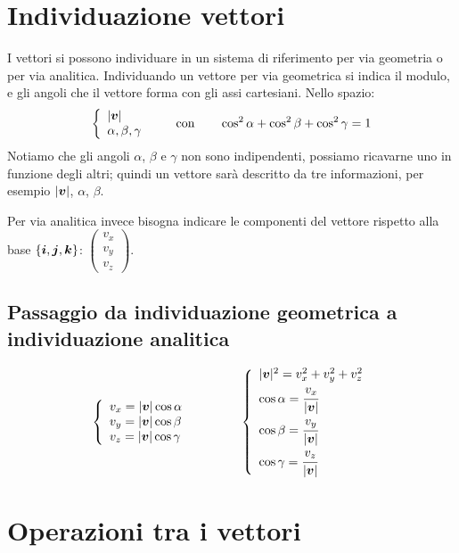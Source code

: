 \section{Individuazione vettori}
I vettori si possono individuare in un sistema di riferimento per via geometria o per via analitica. Individuando un vettore per via geometrica si indica il modulo, e gli angoli che il vettore forma con gli assi cartesiani. Nello spazio:
\begin{equation*}
\left\{
\begin{array}{l}
|\boldsymbol{v}|\\
\alpha,\beta,\gamma
\end{array}\right. \qquad \text{con}\qquad \cos^2 \alpha+\cos^2 \beta + \cos^2
\gamma=1
\end{equation*}
Notiamo che gli angoli $\alpha$, $\beta$ e $\gamma$ non sono indipendenti, possiamo ricavarne uno in funzione degli altri; quindi un vettore sarà descritto da tre informazioni, per esempio $|\boldsymbol{v}|$, $\alpha$, $\beta$.

Per via analitica invece bisogna indicare le componenti del vettore rispetto alla base $\{\boldsymbol{i}, \boldsymbol{j}, \boldsymbol{k}\}$: $\left(
\begin{array}{l}
v_x\\v_y\\v_z
\end{array}\right)
$.
\subsection{Passaggio da individuazione geometrica a individuazione analitica}
\begin{equation*}
\left\{
\begin{array}{l}
v_x=|\boldsymbol{v}|\cos\alpha\\
v_y=|\boldsymbol{v}|\cos\beta\\
v_z=|\boldsymbol{v}|\cos\gamma
\end{array}
\right. \qquad \qquad \left\{
\begin{array}{l}
|\boldsymbol{v}|^2=v_x^2+v_y^2+v_z^2\\
\cos\alpha=\cfrac{v_x}{|\boldsymbol{v}|}\\
\cos\beta=\cfrac{v_y}{|\boldsymbol{v}|}\\
\cos\gamma=\cfrac{v_z}{|\boldsymbol{v}|}
\end{array}
\right.
\end{equation*}


\section{Operazioni tra i vettori}

